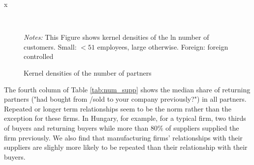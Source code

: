 x\documentclass[final, dvipsnames, authoryear,12pt]{elsarticle}
\begin{document}
\begin{figure}[!h]
    \caption{Kernel densities of the number of partners}
    \label{fig:kernel} 
    \begin{center}    
    \\
     \end{center}    
        {\footnotesize \textit{Notes:} This Figure shows kernel densities of the ln number of customers. Small: $< 51$ employees, large otherwise. Foreign: foreign controlled} 
\end{figure}




The fourth column of Table \ref{tab:num_supp} shows the median share of returning partners ("had bought from /sold to your company previously?")  in all partners. Repeated or longer term relationships seem to be the norm rather than the exception for these firms. In Hungary, for example, for a typical firm, two thirds of buyers and returning buyers while more than 80\% of suppliers supplied the firm previously. We also find that manufacturing firms' relationships with their suppliers are slighly more likely to be repeated than their relationship with their buyers.
\end{document}
